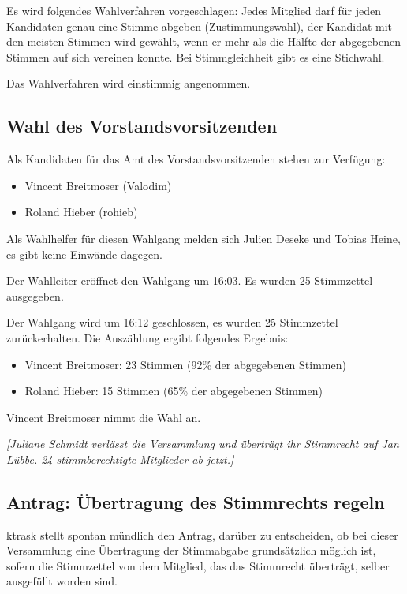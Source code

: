 \documentclass[a4paper,12pt]{scrartcl}
\begin{document}
Es wird folgendes Wahlverfahren vorgeschlagen: Jedes Mitglied darf für jeden
Kandidaten genau eine Stimme abgeben (Zustimmungswahl), der Kandidat mit den
meisten Stimmen wird gewählt, wenn er mehr als die Hälfte der abgegebenen
Stimmen auf sich vereinen konnte. Bei Stimmgleichheit gibt es eine Stichwahl.

Das Wahlverfahren wird einstimmig angenommen.

\subsection{Wahl des Vorstandsvorsitzenden}
Als Kandidaten für das Amt des Vorstandsvorsitzenden stehen zur Verfügung:
\begin{itemize}
  \item Vincent Breitmoser (Valodim)
  \item Roland Hieber (rohieb)
\end{itemize}

Als Wahlhelfer für diesen Wahlgang melden sich Julien Deseke und Tobias Heine,
es gibt keine Einwände dagegen.

Der Wahlleiter eröffnet den Wahlgang um 16:03. Es wurden 25 Stimmzettel
ausgegeben.

Der Wahlgang wird um 16:12 geschlossen, es wurden 25 Stimmzettel zurückerhalten.
Die Auszählung ergibt folgendes Ergebnis:

\begin{itemize}
  \item Vincent Breitmoser: 23 Stimmen (92\% der abgegebenen Stimmen)
  \item Roland Hieber: 15 Stimmen (65\% der abgegebenen Stimmen)
\end{itemize}

Vincent Breitmoser nimmt die Wahl an.

\emph{[Juliane Schmidt verlässt die Versammlung und überträgt ihr Stimmrecht auf
Jan Lübbe. 24 stimmberechtigte Mitglieder ab jetzt.]}

\subsection{Antrag: Übertragung des Stimmrechts regeln}
ktrask stellt spontan mündlich den Antrag, darüber zu entscheiden, ob bei dieser
Versammlung eine Übertragung der Stimmabgabe grundsätzlich möglich ist, sofern
die Stimmzettel von dem Mitglied, das das Stimmrecht überträgt, selber
ausgefüllt worden sind.
\end{document}
